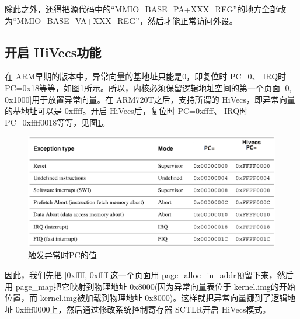 \documentclass[main.tex]{subfiles}
\begin{document}
\begin{CJK*}{UTF8}{song}
\begin{code}
\label{code:4-27}
\inputminted[firstline=379,lastline=384,linenos,numbersep=5pt,frame=lines,framesep=2mm]{c}{src/chapter04/kernel/machdep.c}
\end{code}

除此之外，还得把源代码中的“MMIO\_\-BASE\_\-PA+XXX\_\-REG”的地方全部改为“MMIO\_\-BASE\_\-VA+XXX\_\-REG”，然后才能正常访问外设。

\subsection{开启 HiVecs功能}
在 ARM早期的版本中，异常向量的基地址只能是0，即复位时 PC=0、 IRQ时 PC=0x18等等，如图\ref{figure:4-8}所示。所以，内核必须保留逻辑地址空间的第一个页面 [0, 0x1000]用于放置异常向量。在 ARM\-720T之后，支持所谓的 HiVecs，即异常向量的基地址可以是 0xffff。开启 HiVecs后，复位时 PC=0xffff、 IRQ时 PC=0xffff\-0018等等，见图\ref{figure:4-8}。

\begin{figure}[htp]
\centering
\includegraphics[scale=0.3]{figures/4-8}
\caption{触发异常时PC的值}
\label{figure:4-8}
\end{figure}

因此，我们先把 [0xffff, 0xffff]这一个页面用 page\_\-alloc\_\-in\_\-addr预留下来，然后用 page\_\-map把它映射到物理地址 0x8000(因为异常向量表位于 kernel.img的开始位置，而 kernel.img被加载到物理地址 0x8000)。这样就把异常向量挪到了逻辑地址 0xffff\-0000上，然后通过修改系统控制寄存器 SCTLR开启 HiVecs模式。

\begin{code}
\label{code:4-28}
\inputminted[firstline=386,lastline=404,linenos,numbersep=5pt,frame=lines,framesep=2mm]{c}{src/chapter04/kernel/machdep.c}
\end{code}


\end{CJK*}
\end{document}
